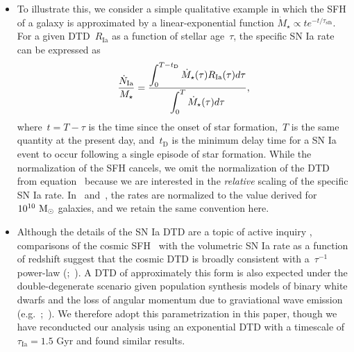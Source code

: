 \documentclass[ms.tex]{subfiles}
\begin{document}
\begin{itemize}
	\item To illustrate this, we consider a simple qualitative example in which
	the SFH of a galaxy is approximated by a linear-exponential function
	$\dot{M}_\star \propto te^{-t/\tau_\text{sfh}}$.
	For a given DTD~$R_\text{Ia}$ as a function of stellar age~$\tau$, the
	specific SN Ia rate can be expressed as
	\begin{equation}
	\frac{\dot{N}_\text{Ia}}{M_\star} =
	\frac{\displaystyle{
		\int_0^{T - t_\text{D}} \dot{M}_\star(\tau) R_\text{Ia}(\tau) d\tau
	}}{\displaystyle{
		\int_0^T \dot{M}_\star(\tau) d\tau
	}},
	\label{eq:specia}
	\end{equation}
	where~$t = T - \tau$ is the time since the onset of star formation,~$T$ is
	the same quantity at the present day, and~$t_\text{D}$ is the minimum delay
	time for a SN Ia event to occur following a single episode of star
	formation.
	While the normalization of the SFH cancels, we omit the normalization of
	the DTD from equation~ because we are interested in the
	\textit{relative} scaling of the specific SN Ia rate.
	In~\citet{Brown2019} and~\citet{Gandhi2022}, the rates are normalized to
	the value derived for~$10^{10}~\text{M}_\odot$ galaxies, and we retain the same
	convention here.

	\item Although the details of the SN Ia DTD are a topic of active inquiry
	\citep[e.g.][]{Greggio2005, Strolger2020, Freundlich2021}, comparisons of
	the cosmic SFH~\citep[e.g.][]{Madau2014, Madau2017} with the volumetric SN
	Ia rate as a function of redshift suggest that the cosmic DTD is broadly
	consistent with a~$\tau^{-1}$ power-law (\citealp*{Maoz2012a, Maoz2012b,
	Graur2013};~\citealp{Graur2014}).
	A DTD of approximately this form is also expected under the
	double-degenerate scenario given population synthesis models of binary
	white dwarfs and the loss of angular momentum due to graviational wave
	emission (e.g.~\citealp{Mennekens2010};~\citealp*{Maoz2014}).
	We therefore adopt this parametrization in this paper, though we have
	reconducted our analysis using an exponential DTD with a timescale of
	$\tau_\text{Ia} = 1.5$ Gyr and found similar results.
	

\end{itemize}
\end{document}
